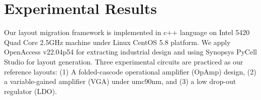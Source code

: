 \chapter{Experimental Results}\label{chap:Exp}

  Our layout migration framework is implemented in c++ language on Intel 5420 Quad Core 2.5GHz machine under Linux CentOS 5.8 platform. We apply OpenAccess v22.04p54 for extracting industrial design and using Synopsys PyCell Studio for layout generation. Three experimental circuits are practiced as our reference layouts: (1) A folded-cascode operational amplifier (OpAmp) design, (2) a variable-gained amplifier (VGA) under umc90nm, and (3) a low drop-out regulator (LDO). 


